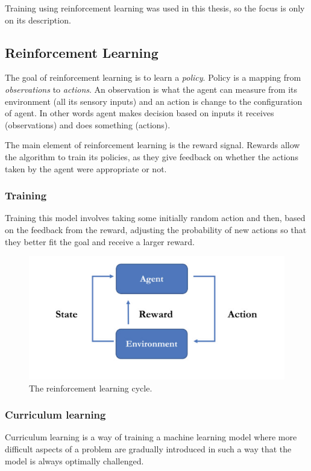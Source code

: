 Training using reinforcement learning was used in this thesis, so the focus is only on its description.

\subsection{Reinforcement Learning}
The goal of reinforcement learning is to learn a \emph{policy}. Policy is a mapping from \emph{observations} to \emph{actions}. An observation is what the agent can measure from its environment (all its sensory inputs) and an action is change to the configuration of agent. In other words agent makes decision based on inputs it receives (observations) and does something (actions).

The main element of reinforcement learning is the reward signal. Rewards allow the algorithm to train its policies, as they give feedback on whether the actions taken by the agent were appropriate or not. 

\subsubsection{Training}
Training this model involves taking some initially random action and then, based on the feedback from the reward, adjusting the probability of new actions so that they better fit the goal and receive a larger reward.

\begin{figure}[H]
    \centering
    \includegraphics[width=\textwidth]{Images/rl_cycle.jpg}
    \caption{The reinforcement learning cycle. \cite{rlCycle}}
    \label{fig:rlCycle}
\end{figure}

\subsubsection{Curriculum learning}
Curriculum learning is a way of training a machine learning model where more difficult aspects of a problem are gradually introduced in such a way that the model is always optimally challenged.

